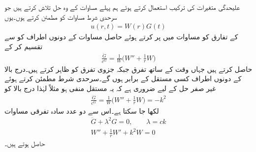  \quad علیحدگی متغیرات کی ترکیب استعمال کرتے ہوئے ہم پہلے مساوات  کے وہ حل تلاش کرتے ہیں جو سرحدی شرط مساوات  کو مطمئن کرتے ہوں۔یوں
\begin{align}\label{مساوات_جزوی_دائری_جھلی_ٹ}
u(r,t)=W(r)G(t)
\end{align}
کے تفارق کو مساوات  میں پر کرتے ہوئے حاصل مساوات کے دونوں اطراف کو  سے تقسیم کر کے
\begin{align*}
\frac{\ddot{G}}{c^G}=\frac{1}{W}\big(W''+\frac{1}{r}W\big)
\end{align*}
حاصل کرتے ہیں جہاں  وقت  کے ساتھ تفرق جبکہ  جزوی تفرق کو ظاہر کرتے ہیں۔درج بالا کے دونوں اطراف کسی مستقل کے برابر ہوں گے۔سرحدی شرط مطمئن کرتے ہوئے غیر صفر حل کے لیے ضروری ہے کہ یہ مستقل منفی ہو مثلاً  لہٰذا درج بالا کو 
\begin{align*}
\frac{\ddot{G}}{c^G}=\frac{1}{W}\big(W''+\frac{1}{r}W\big)=-k^2
\end{align*}
لکھا جا سکتا ہے۔اس سے دو عدد سادہ تفرقی مساوات
\begin{align}
\ddot{G}+\lambda^2G=0,\quad \quad \lambda=ck\label{مساوات_جزوی_دائری_جھلی_ث}\\
W''+\frac{1}{r}W'+k^2W=0\label{مساوات_جزوی_دائری_جھلی_ج}
\end{align}
حاصل ہوتے ہیں۔

